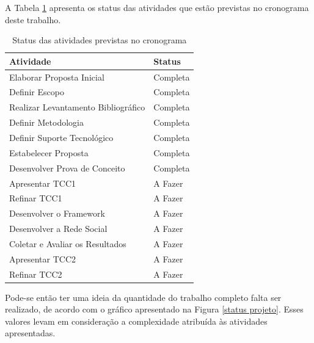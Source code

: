 A Tabela \ref{status atividades} apresenta os status das atividades que estão previstas no cronograma deste trabalho.

\newpage

\begin{table}[h]
\centering
\caption{Status das atividades previstas no cronograma}
\label{status atividades}
\begin{tabular}{@{}ll@{}}
\toprule
\textbf{Atividade}                     & \textbf{Status} \\ \midrule
Elaborar Proposta Inicial              & Completa 		 \\
Definir Escopo                         & Completa 		 \\
Realizar Levantamento Bibliográfico    & Completa 		 \\
Definir Metodologia 				   & Completa 		 \\
Definir Suporte Tecnológico            & Completa 		 \\
Estabelecer Proposta                   & Completa 		 \\
Desenvolver Prova de Conceito          & Completa 		 \\
Apresentar TCC1                        & A Fazer  		 \\
Refinar TCC1                           & A Fazer  		 \\
Desenvolver o Framework                & A Fazer  		 \\
Desenvolver a Rede Social              & A Fazer  		 \\
Coletar e Avaliar os Resultados        & A Fazer  		 \\
Apresentar TCC2                        & A Fazer  		 \\
Refinar TCC2                           & A Fazer  		 \\ \bottomrule
\end{tabular}
\end{table}

Pode-se então ter uma ideia da quantidade do trabalho completo falta ser realizado, de acordo com o gráfico apresentado na Figura \ref{status projeto}. Esses valores levam em consideração a complexidade atribuída às atividades apresentadas.

